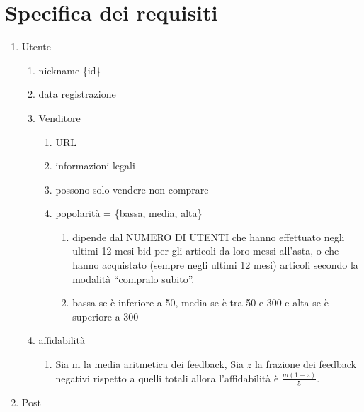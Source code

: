\documentclass{article}
\begin{document}
    \section{Specifica dei requisiti}
        \begin{enumerate}[label=\arabic*.]
            \item Utente
                \begin{enumerate}[label=\arabic{enumi}.\arabic*.]
                    \item nickname \{id\}
                    \item data registrazione
                    \item Venditore
                    \begin{enumerate}[label=\arabic{enumi}.\arabic{enumii}.\arabic*.]
                        \item URL
                        \item informazioni legali
                        \item possono solo vendere non comprare
                        \item popolarità = \{bassa, media, alta\}
                        \begin{enumerate}[label=\arabic{enumi}.\arabic{enumii}.\arabic{enumiii}.\arabic*.]
                            \item dipende dal NUMERO DI UTENTI che hanno effettuato negli ultimi 12 mesi bid per gli articoli da loro messi all’asta, o che hanno acquistato (sempre negli ultimi 12 mesi) articoli secondo la modalità “compralo subito”.
                            \item bassa se è inferiore a 50, media se è tra 50 e 300 e alta se è superiore a 300
                        \end{enumerate}
                    \end{enumerate}
                    \item affidabilità
                    \begin{enumerate}[label=\arabic{enumi}.\arabic{enumii}.\arabic*.]
                        \item Sia m la media aritmetica dei feedback, Sia $z$ la frazione dei feedback negativi rispetto a quelli totali allora l'affidabilità è $\frac{m(1-z)}{5}$.
                    \end{enumerate}
                \end{enumerate}
            \item Post
                \begin{enumerate}[label=\arabic{enumi}.\arabic*.]

\end{enumerate}
\end{enumerate}
\end{document}
